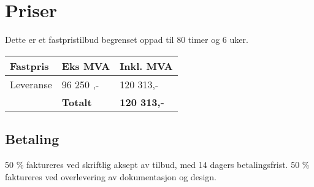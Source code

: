 \section{Priser}
Dette er et fastpristilbud begrenset oppad til 80 timer og 6 uker.

\begin{center}
\begin{tabu} to 0.95\textwidth {  X[l]  X[r]   X[r]  }
 \textbf{Fastpris}  & \textbf{Eks MVA}  & \textbf{Inkl. MVA}\\

 \hline
    Leveranse  & 96 250 ,-  & 120 313,-\\
  \hline
     &  \textbf{Totalt} &  \textbf{120 313,-} \\ 
\hline
\end{tabu}

\end{center}


\subsection{Betaling}
50 \% faktureres ved skriftlig aksept av tilbud, med 14 dagers betalingsfrist. 50 \% faktureres ved overlevering av dokumentasjon og design.